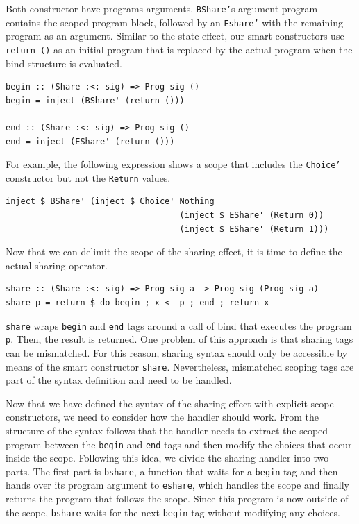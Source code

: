 \documentclass[a4paper, 11pt, fleqn, twoside, abstract=on]{scrreprt}
\newcommand{\hinl}[1]{\texttt{#1}}
\begin{document}
Both constructor have programs arguments.
\hinl{BShare'}s argument program contains the scoped program block, followed by an \hinl{Eshare'} with the remaining program as an argument.
Similar to the state effect, our smart constructors use \hinl{return ()} as an initial program that is replaced by the actual program when the bind structure is evaluated.

\begin{verbatim}
begin :: (Share :<: sig) => Prog sig ()
begin = inject (BShare' (return ()))

end :: (Share :<: sig) => Prog sig ()
end = inject (EShare' (return ()))
\end{verbatim}

For example, the following expression shows a scope that includes the \hinl{Choice'} constructor but not the \hinl{Return} values.

\begin{verbatim}
inject $ BShare' (inject $ Choice' Nothing 
                                   (inject $ EShare' (Return 0))
                                   (inject $ EShare' (Return 1)))
\end{verbatim}

Now that we can delimit the scope of the sharing effect, it is time to define the actual sharing operator.


\begin{verbatim}
share :: (Share :<: sig) => Prog sig a -> Prog sig (Prog sig a)
share p = return $ do begin ; x <- p ; end ; return x
\end{verbatim}

\hinl{share} wraps \hinl{begin} and \hinl{end} tags around a call of bind that executes the program \hinl{p}.
Then, the result is returned.
One problem of this approach is that sharing tags can be mismatched.
For this reason, sharing syntax should only be accessible by means of the smart constructor \hinl{share}.
Nevertheless, mismatched scoping tags are part of the syntax definition and need to be handled.

Now that we have defined the syntax of the sharing effect with explicit scope constructors, we need to consider how the handler should work.
From the structure of the syntax follows that the handler needs to extract the scoped program between the \hinl{begin} and \hinl{end} tags and then modify the choices that occur inside the scope.
Following this idea, we divide the sharing handler into two parts.
The first part is \hinl{bshare}, a function that waits for a \hinl{begin} tag and then hands over its program argument to \hinl{eshare}, which handles the scope and finally returns the program that follows the scope.
Since this program is now outside of the scope, \hinl{bshare} waits for the next \hinl{begin} tag without modifying any choices.
\end{document}
